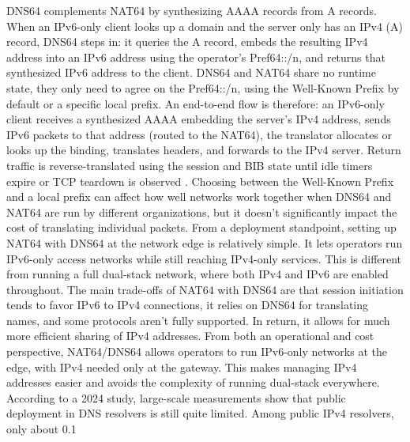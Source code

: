 DNS64 complements NAT64 by synthesizing AAAA records from A records. When an IPv6-only client looks up a domain and the server only has an IPv4 (A) record, DNS64 steps in: it queries the A record, embeds the resulting IPv4 address into an IPv6 address using the operator’s Pref64::/n, and returns that synthesized IPv6 address to the client\cite{rfc6147}. DNS64 and NAT64 share no runtime state, they only need to agree on the Pref64::/n, using the Well-Known Prefix by default or a specific local prefix\cite{6231295}. 
An end-to-end flow is therefore: an IPv6-only client receives a synthesized AAAA embedding the server’s IPv4 address, sends IPv6 packets to that address (routed to the NAT64), the translator allocates or looks up the binding, translates headers, and forwards to the IPv4 server. Return traffic is reverse-translated using the session and BIB state until idle timers expire or TCP teardown is observed \cite{6231295,rfc6147}.
Choosing between the Well-Known Prefix and a local prefix can affect how well networks work together when DNS64 and NAT64 are run by different organizations, but it doesn't significantly impact the cost of translating individual packets\cite{6231295}. From a deployment standpoint, setting up NAT64 with DNS64 at the network edge is relatively simple. It lets operators run IPv6-only access networks while still reaching IPv4-only services. This is different from running a full dual-stack network, where both IPv4 and IPv6 are enabled throughout. The main trade-offs of NAT64 with DNS64 are that session initiation tends to favor IPv6 to IPv4 connections, it relies on DNS64 for translating names, and some protocols aren’t fully supported. In return, it allows for much more efficient sharing of IPv4 addresses\cite{rfc6146}.
From both an operational and cost perspective, NAT64/DNS64 allows operators to run IPv6-only networks at the edge, with IPv4 needed only at the gateway. This makes managing IPv4 addresses easier and avoids the complexity of running dual-stack everywhere. According to a 2024 study, large-scale measurements show that public deployment in DNS resolvers is still quite limited. Among public IPv4 resolvers, only about 0.1%
